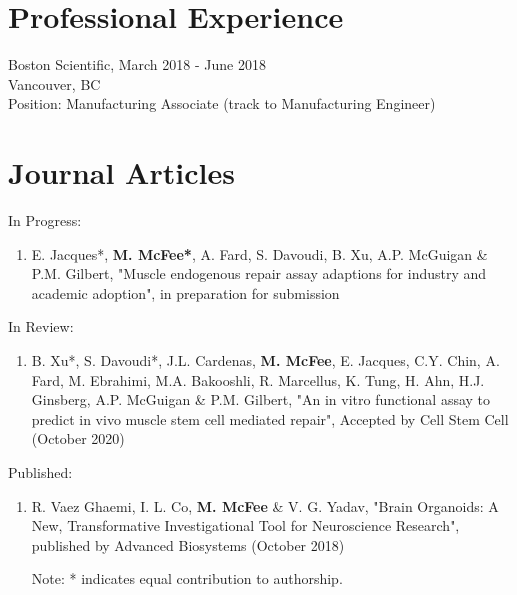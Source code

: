 \documentclass[letterpaper]{article}
\renewenvironment{itemize}{
  \begin{list}{}{
    \setlength{\leftmargin}{1.5em}
  }
}{
  \end{list}
}
\begin{document}
\section*{\textbf{Professional Experience}}

\begin{itemize}
\item Boston Scientific, March 2018 - June 2018
\\Vancouver, BC
\\Position: Manufacturing Associate (track to Manufacturing Engineer)
\end{itemize}

\section*{\textbf{Journal Articles}}

In Progress:
\begin{enumerate}
\item E. Jacques*, \textbf{M. McFee*}, A. Fard, S. Davoudi, B. Xu, A.P. McGuigan \& P.M. Gilbert, "Muscle endogenous repair assay adaptions for industry and academic adoption", in preparation for submission
\end{enumerate}

In Review:
\begin{enumerate}
\item B. Xu*, S. Davoudi*, J.L. Cardenas, \textbf{M. McFee}, E. Jacques, C.Y. Chin, A. Fard, M. Ebrahimi, M.A. Bakooshli, R. Marcellus, K. Tung, H. Ahn, H.J. Ginsberg, A.P. McGuigan \& P.M. Gilbert, "An in vitro functional assay to predict in vivo muscle stem cell mediated repair", Accepted by Cell Stem Cell (October 2020)

\end{enumerate}

Published:
\begin{enumerate}
    \item R. Vaez Ghaemi, I. L. Co, \textbf{M. McFee} \& V. G. Yadav, "Brain Organoids: A New, Transformative Investigational Tool for Neuroscience Research", published by Advanced Biosystems (October 2018)
    
    {\tiny Note: * indicates equal contribution to authorship.}
\end{enumerate}
\end{document}
